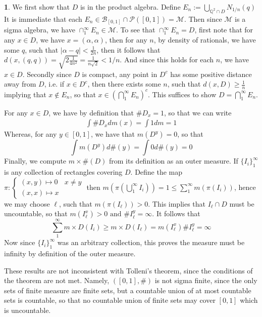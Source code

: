 \documentclass[10.5pt]{article}
\theoremstyle{definition}
\newtheorem{pb}{}
\newcommand{\set}[1]{\{#1\}}
\newcommand{\abs}[1]{\left\vert#1\right\vert}
\newcommand{\tand}{\text{ and }}
\begin{document}
    \begin{pb}
        We first show that \(D\) is in the product algebra. Define \(E_n := \bigcup_{\mathbb{Q}^2 \cap D}N_{1/n}(q)\)
        It is immediate that each \(E_n \in \mathcal{B}_{[0,1]}\cap \mathcal{P}([0,1]) = \mathcal{M}\). Then since \(\mathcal{M}\) is a sigma algebra, we have
        \(\cap_1^\infty E_n \in \mathcal{M}\). To see that \(\cap_1^\infty E_n = D\), first note that for any \(x \in D\), we have \(x = (\alpha,\alpha)\), then for any \(n\), by density
        of rationals, we have some \(q\), such that \(\abs{\alpha - q} < \frac{1}{2n}\), then it follows that \(d(x,(q,q)) = \sqrt{2\frac{1}{4n^2}} = \frac{1}{n\sqrt{2}} < 1/n\). And since this holds for
        each \(n\), we have \(x \in D\). Secondly since \(D\) is compact, any point in \(D^c\) has some positive distance away from \(D\), i.e. if \(x \in D^c\), then there exists some \(n\), such that
        \(d(x,D) \geq \frac{1}{n}\) implying that \(x \not \in E_n\), so that \(x \in \left(\bigcap_1^\infty E_n \right)^c\). This suffices to show \(D = \bigcap_1^\infty E_n\).

        For any \(x \in D\), we have by definition that \(\# D_x = 1\), so that we can write
        \begin{align*}
            \int \# D_x dm(x) = \int 1 dm = 1
        \end{align*}
        Whereas, for any \(y \in [0,1]\), we have that \(m(D^y) = 0\), so that
        \[\int m(D^y)d\#(y) = \int 0 d \#(y) = 0\]
        Finally, we compute \(m \times \# (D)\) from its definition as an outer measure. If \(\set{I_i}_1^\infty\) is any collection of rectangles covering \(D\). Define the map
        \(\pi: \begin{cases}
            (x,y) \mapsto 0 & x\neq y \\
            (x,x) \mapsto x
        \end{cases}\) then \(m\left(\pi\left(\bigcup_1^\infty I_i\right)\right) = 1 \leq \sum_1^\infty m(\pi(I_i))\), hence we may choose \(\ell\), such that \(m(\pi(I_\ell)) > 0\). This implies that
        \(I_\ell \cap D\) must be uncountable, so that \(m(I_\ell^x) > 0 \tand \# I_\ell^y = \infty\). 
        It follows that \[\sum_1^\infty m \times D (I_i) \geq m \times D (I_\ell) = m(I_\ell^x) \# I_\ell^y = \infty\]
        Now since \(\set{I_i}_1^\infty\) was an arbitrary collection, this proves the measure must be infinity by definition of the outer measure.
        
        These results are not inconsistent with Tolleni's theorem, since the conditions of the theorem are not met. Namely, \(([0,1],\#)\) is not sigma finite, since the only
        sets of finite measure are finite sets, but a countable union of at most countable sets is countable, so that no countable union of finite sets may cover \([0,1]\) which is uncountable.
    \end{pb}
\end{document}
